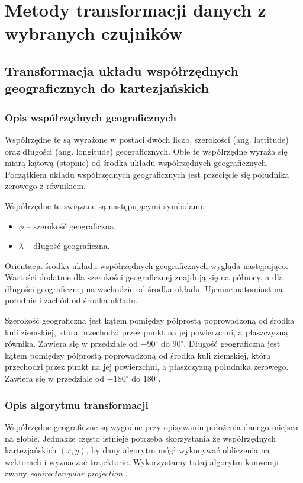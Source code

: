 \newpage

\section{Metody transformacji danych z wybranych czujników}\label{transformation_methods}
{
    \subsection{Transformacja układu współrzędnych geograficznych do kartezjańskich}
    {
        \subsubsection{Opis współrzędnych geograficznych}
        {
            Współrzędne te są wyrażone w postaci dwóch liczb, szerokości (ang. lattitude) oraz długości (ang. longitude) geograficznych. Obie te współrzędne wyraża się miarą kątową (stopnie) od środka układu współrzędnych geograficznych. Początkiem układu współrzędnych geograficznych jest przecięcie się południka zerowego z równikiem.
            
            Współrzędne te związane są następującymi symbolami:
            \begin{itemize}
                \item $\phi$ --  szerokość geograficzna,
                \item $\lambda$ --  długość geograficzna.
            \end{itemize}
            
            Orientacja środka układu współrzędnych geograficznych wygląda następująco. Wartości dodatnie dla szerokości geograficznej znajdują się na północy, a dla długości geograficznej na wschodzie od środka układu. Ujemne natomiast na południe i zachód od środka układu.
            
            Szerokość geograficzna jest kątem pomiędzy półprostą poprowadzoną od środka kuli ziemskiej, która przechodzi przez punkt na jej powierzchni, a płaszczyzną równika. Zawiera się w przedziale od $-90^{\circ}$ do $90^{\circ}$.
            Długość geograficzna jest kątem pomiędzy półprostą poprowadzoną od środka kuli ziemskiej, która przechodzi przez punkt na jej powierzchni, a płaszczyzną południka zerowego. Zawiera się w przedziale od $-180^{\circ}$ do $180^{\circ}$.
        }
        \label{gps_to_xy_transform}
        \subsubsection{Opis algorytmu transformacji}
        {
            Współrzędne geograficzne są wygodne przy opisywaniu położenia danego miejsca na globie. Jednakże często istnieje potrzeba skorzystania ze współrzędnych kartezjańskich $(x, y)$, by dany algorytm mógł wykonywać obliczenia na wektorach i wyznaczać trajektorie. Wykorzystamy tutaj algorytm konwersji zwany \textit{equirectangular projection} \cite{geo_cords}. 

}}}
